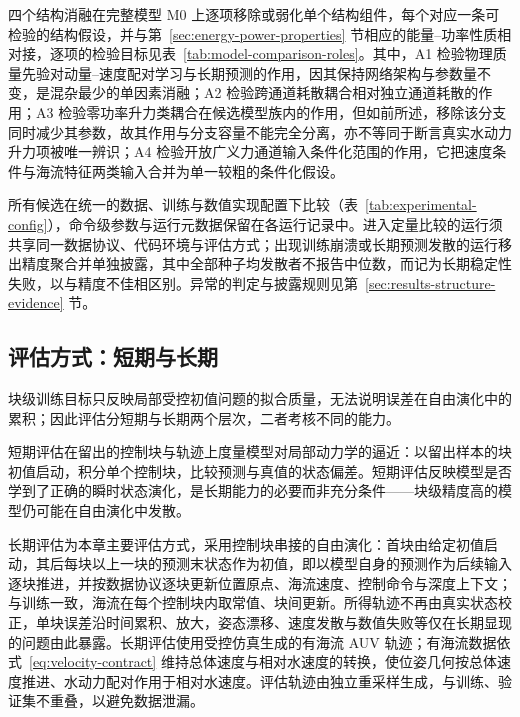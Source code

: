 四个结构消融在完整模型 M0 上逐项移除或弱化单个结构组件，每个对应一条可检验的结构假设，并与第~\ref{sec:energy-power-properties} 节相应的能量--功率性质相对接，逐项的检验目标见表~\ref{tab:model-comparison-roles}。其中，A1 检验物理质量先验对动量--速度配对学习与长期预测的作用，因其保持网络架构与参数量不变，是混杂最少的单因素消融；A2 检验跨通道耗散耦合相对独立通道耗散的作用；A3 检验零功率升力类耦合在候选模型族内的作用，但如前所述，移除该分支同时减少其参数，故其作用与分支容量不能完全分离，亦不等同于断言真实水动力升力项被唯一辨识；A4 检验开放广义力通道输入条件化范围的作用，它把速度条件与海流特征两类输入合并为单一较粗的条件化假设。

所有候选在统一的数据、训练与数值实现配置下比较（表~\ref{tab:experimental-config}），命令级参数与运行元数据保留在各运行记录中。进入定量比较的运行须共享同一数据协议、代码环境与评估方式；出现训练崩溃或长期预测发散的运行移出精度聚合并单独披露，其中全部种子均发散者不报告中位数，而记为长期稳定性失败，以与精度不佳相区别。异常的判定与披露规则见第~\ref{sec:results-structure-evidence} 节。

\subsection{评估方式：短期与长期}
\label{subsec:rollout-eval}

块级训练目标只反映局部受控初值问题的拟合质量，无法说明误差在自由演化中的累积；因此评估分短期与长期两个层次，二者考核不同的能力。

短期评估在留出的控制块与轨迹上度量模型对局部动力学的逼近：以留出样本的块初值启动，积分单个控制块，比较预测与真值的状态偏差。短期评估反映模型是否学到了正确的瞬时状态演化，是长期能力的必要而非充分条件——块级精度高的模型仍可能在自由演化中发散。

长期评估为本章主要评估方式，采用控制块串接的自由演化：首块由给定初值启动，其后每块以上一块的预测末状态作为初值，即以模型自身的预测作为后续输入逐块推进，并按数据协议逐块更新位置原点、海流速度、控制命令与深度上下文；与训练一致，海流在每个控制块内取常值、块间更新。所得轨迹不再由真实状态校正，单块误差沿时间累积、放大，姿态漂移、速度发散与数值失败等仅在长期显现的问题由此暴露。长期评估使用受控仿真生成的有海流 AUV 轨迹；有海流数据依式~\eqref{eq:velocity-contract} 维持总体速度与相对水速度的转换，使位姿几何按总体速度推进、水动力配对作用于相对水速度。评估轨迹由独立重采样生成，与训练、验证集不重叠，以避免数据泄漏。


